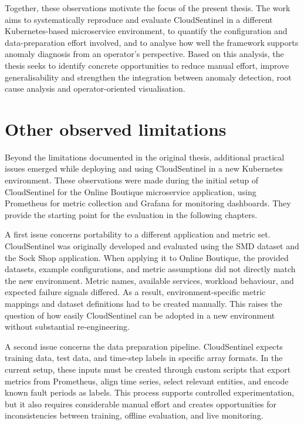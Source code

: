 Together, these observations motivate the focus of the present thesis. The work aims to systematically reproduce and evaluate CloudSentinel in a different Kubernetes-based microservice environment, to quantify the configuration and data-preparation effort involved, and to analyse how well the framework supports anomaly diagnosis from an operator’s perspective. Based on this analysis, the thesis seeks to identify concrete opportunities to reduce manual effort, improve generalisability and strengthen the integration between anomaly detection, root cause analysis and operator-oriented visualisation.

\section{Other observed limitations}

Beyond the limitations documented in the original thesis, additional practical issues emerged while deploying and using CloudSentinel in a new Kubernetes environment. These observations were made during the initial setup of CloudSentinel for the Online Boutique microservice application, using Prometheus for metric collection and Grafana for monitoring dashboards. They provide the starting point for the evaluation in the following chapters.

A first issue concerns portability to a different application and metric set. CloudSentinel was originally developed and evaluated using the SMD dataset and the Sock Shop application. When applying it to Online Boutique, the provided datasets, example configurations, and metric assumptions did not directly match the new environment. Metric names, available services, workload behaviour, and expected failure signals differed. As a result, environment-specific metric mappings and dataset definitions had to be created manually. This raises the question of how easily CloudSentinel can be adopted in a new environment without substantial re-engineering.

A second issue concerns the data preparation pipeline. CloudSentinel expects training data, test data, and time-step labels in specific array formats. In the current setup, these inputs must be created through custom scripts that export metrics from Prometheus, align time series, select relevant entities, and encode known fault periods as labels. This process supports controlled experimentation, but it also requires considerable manual effort and creates opportunities for inconsistencies between training, offline evaluation, and live monitoring.

